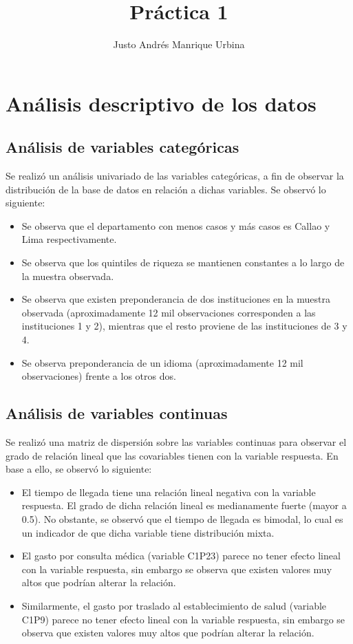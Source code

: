 \documentclass{article}
\title{Práctica 1}
\author{Justo Andrés Manrique Urbina}
\begin{document}
\maketitle
\section{Análisis descriptivo de los datos}
\subsection{Análisis de variables categóricas}
Se realizó un análisis univariado de las variables categóricas, a fin de observar la distribución de la base de datos en relación a dichas variables. Se observó lo siguiente:
\begin{itemize}
	\item Se observa que el departamento con menos casos y más casos es Callao y Lima respectivamente.
	\item Se observa que los quintiles de riqueza se mantienen constantes a lo largo de la muestra observada.
	\item Se observa que existen preponderancia de dos instituciones en la muestra observada (aproximadamente 12 mil observaciones corresponden a las instituciones 1 y 2), mientras que el resto proviene de las instituciones de 3 y 4.
	\item Se observa preponderancia de un idioma (aproximadamente 12 mil observaciones) frente a los otros dos.
\end{itemize}
\subsection{Análisis de variables continuas}
Se realizó una matriz de dispersión sobre las variables continuas para observar el grado de relación lineal que las covariables tienen con la variable respuesta. En base a ello, se observó lo siguiente:
\begin{itemize}
	\item El tiempo de llegada tiene una relación lineal negativa con la variable respuesta. El grado de dicha relación lineal es medianamente fuerte (mayor a 0.5). No obstante, se observó que el tiempo de llegada es bimodal, lo cual es un indicador de que dicha variable tiene distribución mixta.
	\item El gasto por consulta médica (variable C1P23) parece no tener efecto lineal con la variable respuesta, sin embargo se observa que existen valores muy altos que podrían alterar la relación.
	\item Similarmente, el gasto por traslado al establecimiento de salud (variable C1P9) parece no tener efecto lineal con la variable respuesta, sin embargo se observa que existen valores muy altos que podrían alterar la relación.
\end{itemize}
\end{document}
